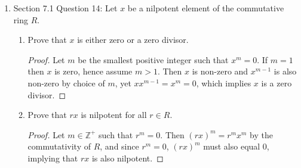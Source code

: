 \documentclass{article}
\begin{document}
\begin{enumerate}[label={\bf Q\arabic*:}]
\begin{enumerate}
\begin{proof}
          The distinct prime factors of 72 are only 2 and 3. Hence from the
          previous assertion, the nilpotent elements of $\mathbb{Z}_{72}$
          are exactly the multiples of $2\cdot3=6$, which are
          \[\{\overline{a}:a\in\{0,6,12,18,24,30,36,42,48,54,60,66\}\}\].
        \end{proof}

      \item Let $R$ be the ring of functiosn from a non-empty set $X$ to a
        field $F$. Prove that $R$ contains no non-zero nilpotent elements.

        \begin{proof}
          Let $f:X\rightarrow F\in R=F^X$ be a nilpotent element. Then
          $f^m=0$ for some $m\in\mathbb{Z}^+$. This implies that
          $f(x)^m=0\in F$ for all $x\in X$. Since $F$ contains no
          zero-divisors, we have $f(x)=0$ for all $x\in X$, which means $f$
          can only be zero. Hence the only nilpotent element of $R$ is 0.
        \end{proof}
    \end{enumerate}

  \item Section 7.1 Question 14: Let $x$ be a nilpotent element of the
    commutative ring $R$.
    \begin{enumerate}
      \item Prove that $x$ is either zero or a zero divisor.
        \begin{proof}
          Let $m$ be the smallest positive integer such that $x^m=0$. If
          $m=1$ then $x$ is zero, hence assume $m>1$. Then $x$ is non-zero
          and $x^{m-1}$ is also non-zero by choice of $m$, yet
          $xx^{m-1}=x^m=0$, which implies $x$ is a zero divisor.
        \end{proof}

      \item Prove that $rx$ is nilpotent for all $r\in R$.
        \begin{proof}
          Let $m\in\mathbb{Z}^+$ such that $r^m=0$. Then $(rx)^m=r^mx^m$ by
          the commutativity of $R$, and since $r^m=0$, $(rx)^m$ must also
          equal 0, implying that $rx$ is also nilpotent.
        \end{proof}


\end{enumerate}
\end{enumerate}
\end{document}
